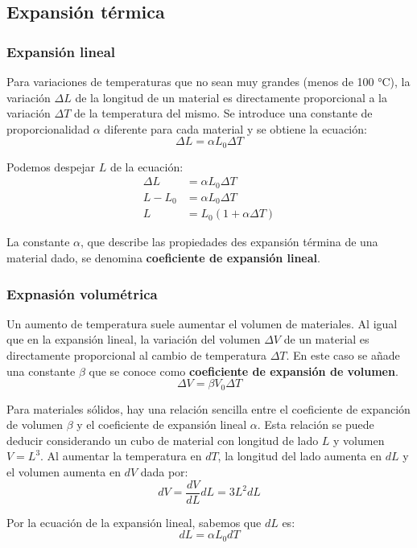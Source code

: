 \documentclass[12pt]{article}
\begin{document}
  \subsection{Expansión térmica}
  \subsubsection{Expansión lineal}
  Para variaciones de temperaturas que no sean muy grandes (menos de 100 °C), la variación $ \Delta L $ de la longitud de un material es directamente proporcional a la variación $ \Delta T $ de la temperatura del mismo. Se introduce una constante de proporcionalidad $ \alpha $ diferente para cada material y se obtiene la ecuación:
  \[
    \Delta L = \alpha L_{0}\Delta T
  \]
  
  Podemos despejar $ L $ de la ecuación:
  \begin{align*}
    \Delta L &= \alpha L_{0}\Delta T\\
    L - L_{0} &= \alpha L_{0}\Delta T\\
    L &= L_{0} \left(1 + \alpha\Delta T\right)
  \end{align*}

  La constante $ \alpha $, que describe las propiedades des expansión términa de una material dado, se denomina \textbf{coeficiente de expansión lineal}.

  \subsubsection{Expnasión volumétrica}
  Un aumento de temperatura suele aumentar el volumen de materiales. Al igual que en la expansión lineal, la variación del volumen $ \Delta V $ de un material es directamente proporcional al cambio de temperatura $ \Delta T $. En este caso se añade una constante $ \beta $ que se conoce como \textbf{coeficiente de expansión de volumen}.
  \[
    \Delta V  = \beta V_{0}\Delta T
  \]
  
  Para materiales sólidos, hay una relación sencilla entre el coeficiente de expanción de volumen $ \beta $ y  el coeficiente de expansión lineal $ \alpha $. Esta relación se puede deducir considerando un cubo de material con longitud de lado $ L $ y volumen $ V = L^{3} $. Al aumentar la temperatura en $ dT $, la longitud del lado aumenta en $ dL $ y el volumen aumenta en $ dV $ dada por:
  \[
  dV = \frac{dV}{dL}dL = 3L^{2}dL
  \]
  
  Por la ecuación de la expansión lineal, sabemos que $ dL $ es:
  \[
  dL = \alpha L_{0}dT
  \]
\end{document}
